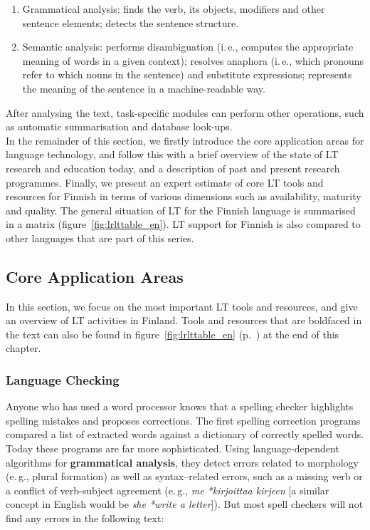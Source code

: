 \begin{multicols}{2}
\begin{enumerate}
\item Grammatical analysis: finds the verb, its objects, modifiers and
other sentence elements; detects the sentence structure.

\item Semantic analysis: performs disambiguation (i.\,e., computes the
appropriate meaning of words in a given context); resolves anaphora
(i.\,e., which pronouns refer to which nouns in the sentence) and
substitute expressions; represents the meaning of the sentence in
a machine-readable way.
\end{enumerate}
After analysing the text, task-specific modules can perform other
operations, such as automatic summarisation and database
look-ups. \\
In the remainder of this section, we firstly introduce the core application areas for language technology, and follow this with a brief overview of the state of LT research and education today, and a description of past and present research programmes. Finally, we present an expert estimate of core LT tools and resources for Finnish in terms of various dimensions such as availability, maturity and quality. The general situation of LT for the Finnish language is summarised in a matrix (figure~\ref{fig:lrlttable_en}). 
LT support for Finnish is also compared to other languages that are part of this series.


\subsection{Core Application Areas}

In this section, we focus on the most important LT tools and
resources, and give an overview of LT activities in Finland. 
Tools and resources that are boldfaced in the text can also be found in figure~\ref{fig:lrlttable_en} (p.~\pageref{fig:lrlttable_en}) at the end of this chapter. 


\subsubsection{Language Checking}

Anyone who has used a word processor knows that a spelling checker highlights 
spelling mistakes and proposes corrections.  The first spelling correction programs compared
a list of extracted words against a dictionary of correctly spelled
words. Today these programs are far more sophisticated. Using
language-dependent algorithms for \textbf{grammatical analysis},
they detect errors
related to morphology (e.\,g., plural formation) as well as
syntax–related errors, such as a missing verb or a conflict of
verb-subject agreement (e.\,g.,
\textit{\foreignlanguage{finnish}{\textit{me *kirjoittaa kirjeen}}}
 [a similar concept in English would be
\textit{she *write a letter}]).
But most spell checkers will not find any errors in the
following text:


\end{multicols}
